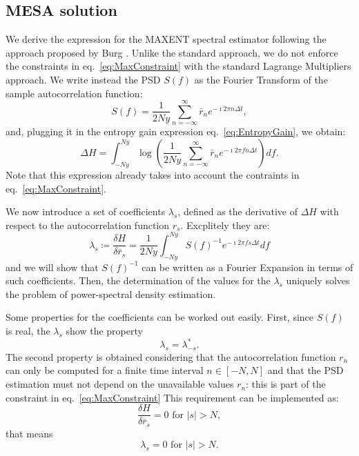 \documentclass[twocolumn,showpacs,preprintnumbers,nofootinbib,prd,
superscriptaddress,10pt]{revtex4-1}
\begin{document}
\subsection{MESA solution}\label{sec:MESA_solution}
We derive the expression for the MAXENT spectral estimator following the approach proposed by Burg \cite{burg1975maximum}.
Unlike the standard approach, we do not enforce the constraints in eq.~\eqref{eq:MaxConstraint} with the standard Lagrange Multipliers approach.
We write instead the PSD $S(f)$ as the Fourier Transform of the sample autocorrelation function: 
\begin{equation}
    S(f) = \frac{1}{2 Ny}\sum_{n = -\infty}^{\infty} \bar r_n e^{- \imath 2 \pi n \Delta t},
\end{equation}
and, plugging it in the entropy gain expression eq.~\eqref{eq:EntropyGain}, we obtain:
\begin{equation}
    \Delta H = \int_{-Ny}^{Ny}  
    \log\left(\frac{1}{2 Ny}\sum_{n = -\infty}^{\infty} \bar r_n e^{-\imath 2 \pi f n \Delta t} 
    \right) df.
\end{equation}
Note that this expression already takes into account the contraints in eq.~\eqref{eq:MaxConstraint}.

We now introduce a set of coefficients $\lambda_s$, defined as the derivative of $\Delta H$ with respect to the autocorrelation function $r_s$.
Excplitely they are:
\begin{equation} \label{eq:lamdas}
      \lambda_s \coloneqq \frac{\delta H}{\delta \bar r_s} = \frac{1}{2Ny}\int_{-Ny}^{Ny} S(f)^{-1}e^{-\imath 2 \pi f s \Delta t } df
\end{equation} 
and we will show that $S(f)^{-1}$ can be written as a Fourier Expansion in terms of such coefficients. Then, the determination of the values for the $\lambda_s$ uniquely solves the problem of power-spectral density estimation.

Some properties for the coefficients can be worked out easily. First, since $S(f)$ is real, the $\lambda_s$ show the property 
\begin{equation}
	\nonumber 
	\lambda_s = \lambda_{-s}^*. 
\end{equation}
The second property is obtained considering that the autocorrelation function $r_n$ can only be computed for a finite time interval $n \in [-N, N]$ and that the PSD estimation must not depend on the unavailable values $r_n$: this is part of the constraint in eq.~\eqref{eq:MaxConstraint}
This requirement can be implemented as:  
\begin{equation}\nonumber 
    \frac{\delta H}{\delta \bar r_s} = 0 \text{ for } \vert s \vert > N,
\end{equation}
that means 
\begin{equation}
\nonumber 
\lambda_s = 0 \text{ for } \vert s \vert > N. 
\end{equation}
\end{document}
